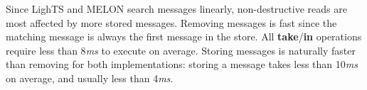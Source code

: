 \documentclass[lnicst]{svmultln}
\begin{document}


Since LighTS and MELON search messages linearly, non-destructive reads are most affected by more stored messages. Removing messages is fast since the matching message is always the first message in the store. All \textbf{take}/\textbf{in} operations require less than 8\textit{ms} to execute on average. Storing messages is naturally faster than removing for both implementations: storing a message takes less than 10\textit{ms} on average, and usually less than 4\textit{ms}.






\end{document}
